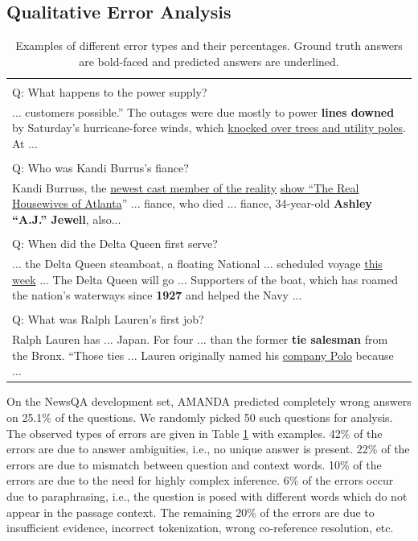 \documentclass[letterpaper]{article}
\begin{document}
\subsection{Qualitative Error Analysis}
\label{sec:qual_error_analysis}
\begin{table}[t]
\centering
\begin{adjustbox}{width=0.8\columnwidth}
\begin{tabular}{|p{8.0cm}|}
\hline
\noindent{Answer ambiguity (42\%)} \\
Q: What happens to the power supply? \\
... customers possible.'' The outages were due mostly to power \textbf{lines downed} by Saturday's hurricane-force winds, which \underline{knocked over trees and utility poles}. At  ... \\ \hline
\noindent{Context mismatch (22\%)} \\
Q: Who was Kandi Burrus's fiance? \\
Kandi Burruss, the \underline{newest cast member of the reality} \underline{show ``The Real Housewives of Atlanta}'' ... fiance, who died ... fiance, 34-year-old \textbf{Ashley ``A.J.'' Jewell}, also... \\
\hline
\noindent{Complex inference (10\%)} \\
Q: When did the Delta Queen first serve? \\
...  the Delta Queen steamboat, a floating National ... scheduled voyage \underline{this week} ... The Delta Queen will go ... Supporters of the boat, which has roamed the nation's waterways since \textbf{1927} and helped the Navy ... \\
\hline
\noindent{Paraphrasing issues (6\%)} \\
Q: What was Ralph Lauren's first job? \\
Ralph Lauren has ... Japan. For four ... than the former \textbf{tie salesman} from the Bronx. ``Those ties ... Lauren originally named his \underline{company Polo} because ... \\
\hline
\end{tabular}
\end{adjustbox}
\caption{Examples of different error types and their percentages. Ground truth answers are bold-faced and predicted answers are underlined.}
\label{tab:qual_analysis}
\end{table}
On the NewsQA development set, AMANDA predicted completely wrong answers on 25.1\% of the questions. We randomly picked 50 such questions for analysis. The observed types of errors are given in Table \ref{tab:qual_analysis} with examples. 42\% of the errors are due to answer ambiguities, i.e., no unique answer is present.
22\% of the errors are due to mismatch between question and context words.
10\% of the errors are due to the need for highly complex inference.
6\% of the errors occur due to paraphrasing, i.e., the question is posed with different words which do not appear in the passage context.
The remaining 20\% of the errors are due to insufficient evidence, incorrect tokenization, wrong co-reference resolution, etc.
\end{document}
